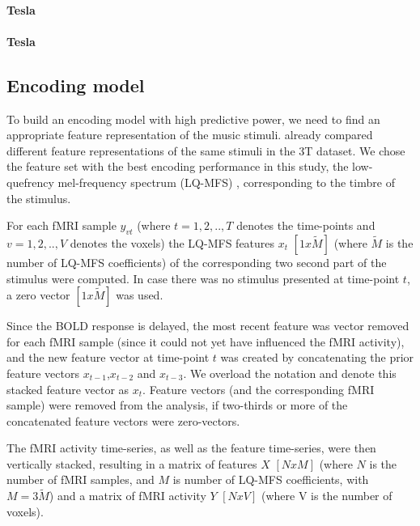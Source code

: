 \paragraph{\unit[3]{Tesla}}
\paragraph{\unit[7]{Tesla}}

\subsection*{Encoding model}

To build an encoding model with high predictive power, we need to find an
appropriate feature representation of the music stimuli.  
\cite{CTK+2012} already compared different feature representations of the same stimuli in the 3T
dataset. We chose the feature set with the best encoding performance in this
study, the low-quefrency mel-frequency spectrum (LQ-MFS) \cite{HDH+2015}, corresponding to the timbre of the stimulus. 




For each f{MRI} sample $y_{vt}$ (where $t=1,2,..,T$ denotes the time-points and
$v=1,2,..,V$ denotes the voxels) the LQ-MFS features $x_{t}$ $[1x\widetilde{M}]$
(where $\widetilde{M}$ is the number of LQ-MFS coefficients) of the
corresponding two second part of the stimulus were computed. In case there was
no stimulus presented at time-point $t$, a zero vector $[1x\widetilde{M}]$ was
used. 

Since the BOLD response is delayed,  the most recent feature was vector removed for each f{MRI} sample (since it could not yet have influenced the f{MRI} activity), 
and the new feature vector at time-point $t$ was created by concatenating the
prior feature vectors $x_{t-1}$,$x_{t-2}$ and $x_{t-3}$. We overload the
notation and denote this stacked feature vector as $x_{t}$. Feature vectors (and the corresponding f{MRI} sample) were removed from the analysis, if two-thirds or more of the concatenated feature vectors were zero-vectors.

The f{MRI} activity time-series, as well as the feature time-series, were then vertically stacked, resulting in a matrix of features $X$ $[NxM]$ (where $N$ is the number of f{MRI} samples, and $M$ is number of LQ-MFS coefficients, with $M=3\widetilde{M}$) and a matrix of f{MRI} activity $Y$ $[NxV]$ (where V is the number of voxels).

